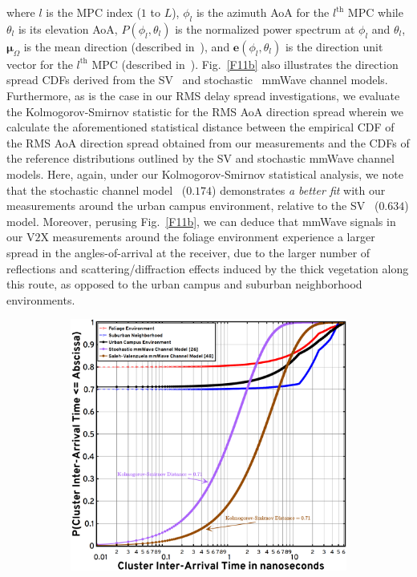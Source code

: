 \documentclass[10pt, twocolumn]{IEEEtran}
\begin{document}
{where $l$ is the MPC index ($1$ to $L$), $\phi_{l}$ is the azimuth AoA for the $l^{\mathrm{th}}$ MPC while $\theta_{l}$ is its elevation AoA, $P(\phi_{l}, \theta_{l})$ is the normalized power spectrum at $\phi_{l}$ and $\theta_{l}$, $\boldsymbol{\mu}_{\Omega}$ is the mean direction (described in~\cite{Indoor60G}), and $\mathbf{e}(\phi_{l}, \theta_{l})$ is the direction unit vector for the $l^{\mathrm{th}}$ MPC (described in~\cite{Indoor60G}). Fig.~\ref{F11b} also illustrates the direction spread CDFs derived from the SV~\cite{SV_Molisch} and stochastic~\cite{Indoor60G} mmWave channel models. Furthermore, as is the case in our RMS delay spread investigations, we evaluate the Kolmogorov-Smirnov statistic for the RMS AoA direction spread wherein we calculate the aforementioned statistical distance between the empirical CDF of the RMS AoA direction spread obtained from our measurements and the CDFs of the reference distributions outlined by the SV and stochastic mmWave channel models. Here, again, under our Kolmogorov-Smirnov statistical analysis, we note that the stochastic channel model~\cite{Indoor60G} ($0.174$) demonstrates \emph{a better fit} with our measurements around the urban campus environment, relative to the SV~\cite{SV_Molisch} ($0.634$) model. Moreover, perusing Fig.~\ref{F11b}, we can deduce that mmWave signals in our V$2$X measurements around the foliage environment experience a larger spread in the angles-of-arrival at the receiver, due to the larger number of reflections and scattering/diffraction effects induced by the thick vegetation along this route, as opposed to the urban campus and suburban neighborhood environments.
\begin{figure} [t]
    \centering
    \begin{subfigure}{0.4975\linewidth}
        \centering
        \includegraphics[width=1.0\linewidth]{figs/cluster_arrival_characteristics.png}

\end{subfigure}
\end{figure}}
\end{document}
